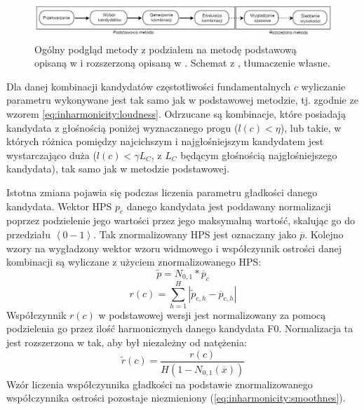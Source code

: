 \documentclass[12pt,a4paper,twoside]{mwart}
\begin{document}
\begin{figure}[ht]
  \begin{center}
    \includegraphics[scale=0.31]{images/Pertusa_2012_methodology.png}
    \caption{Ogólny podgląd metody z podziałem na metodę podstawową opisaną w \cite{Transcription:Pertus:Inharmonicity} i rozszerzoną opisaną w \cite{Transcription:Pertus:Inharmonicity2}. Schemat z \cite[3]{Transcription:Pertus:Inharmonicity2}, tłumaczenie własne.}
    \label{fig:petrusa_2012_methodology}
  \end{center}
\end{figure}

Dla danej kombinacji kandydatów częstotliwości fundamentalnych $c$ wyliczanie parametru wykonywane jest tak samo jak w podstawowej metodzie, tj. zgodnie ze wzorem \ref{eq:inharmonicity:loudness}. Odrzucane są kombinacje, które posiadają kandydata z głośnością poniżej wyznaczanego progu ($l(c) < \eta$), lub takie, w których różnica pomiędzy najcichszym i najgłośniejszym kandydatem jest wystarczająco duża ($l(c) < \gamma L_C$, z $L_C$ będącym głośnością najgłośniejszego kandydata), tak samo jak w metodzie podstawowej.

Istotna zmiana pojawia się podczas liczenia parametru gładkości danego kandydata. Wektor HPS $p_c$ danego kandydata jest poddawany normalizacji poprzez podzielenie jego wartości przez jego maksymalną wartość, skalując go do przedziału $\left<0-1\right>$. Tak znormalizowany HPS jest oznaczany jako $\overline{p}$. Kolejno wzory na wygładzony wektor wzoru widmowego i współczynnik ostrości danej kombinacji są wyliczane z użyciem znormalizowanego HPS:
\begin{equation}\label{eq:inharmonicity2:hpsSmoothed}
  \widetilde{p} = N_{0,1}\ast \overline{p}_c 
\end{equation}
\begin{equation}\label{eq:inharmonicity2:sharpness}
  r(c) = \sum_{h=1}^H\left|\widetilde{p}_{c,h} - \overline{p}_{c,h} \right|
\end{equation}
Współczynnik $r(c)$ w podstawowej wersji jest normalizowany za pomocą podzielenia go przez ilość harmonicznych danego kandydata F0. Normalizacja ta jest rozszerzona w \cite[5-6]{Transcription:Pertus:Inharmonicity2} tak, aby był niezależny od natężenia:
\begin{equation}\label{eq:inharmonicity2:roughness}
  \widetilde{r}(c) = \frac{r(c)}{H(1 - N_{0, 1}(\overline{x}))}
\end{equation}
Wzór liczenia współczynnika gładkości na podstawie znormalizowanego współczynnika ostrości pozostaje niezmieniony (\ref{eq:inharmonicity:smoothnes}).
\end{document}
